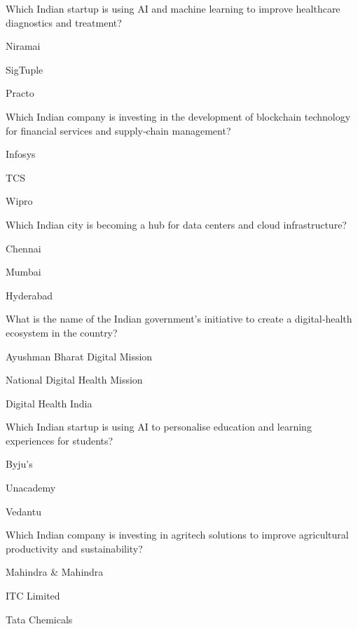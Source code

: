 \begin{enhancedmcq}{Which Indian startup is using AI and machine learning to improve healthcare diagnostics and treatment?}
\item Niramai
\item SigTuple
\item Practo

\end{enhancedmcq}
\begin{enhancedmcq}{Which Indian company is investing in the development of blockchain technology for financial services and supply‑chain management?}
\item Infosys
\item TCS
\item Wipro

\end{enhancedmcq}
\begin{enhancedmcq}{Which Indian city is becoming a hub for data centers and cloud infrastructure?}
\item Chennai
\item Mumbai
\item Hyderabad

\end{enhancedmcq}
\begin{enhancedmcq}{What is the name of the Indian government's initiative to create a digital‑health ecosystem in the country?}
\item Ayushman Bharat Digital Mission
\item National Digital Health Mission
\item Digital Health India

\end{enhancedmcq}
\begin{enhancedmcq}{Which Indian startup is using AI to personalise education and learning experiences for students?}
\item Byju's
\item Unacademy
\item Vedantu

\end{enhancedmcq}
\begin{enhancedmcq}{Which Indian company is investing in agritech solutions to improve agricultural productivity and sustainability?}
\item Mahindra & Mahindra
\item ITC Limited
\item Tata Chemicals

\end{enhancedmcq}
